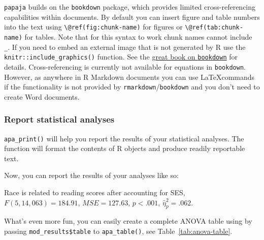 \documentclass[
  english,
  man]{apa6}
\begin{document}
\texttt{papaja} builds on the \texttt{bookdown} package, which provides limited cross-referencing capabilities within documents.
By default you can insert figure and table numbers into the text using \texttt{\textbackslash{}@ref(fig:chunk-name)} for figures or \texttt{\textbackslash{}@ref(tab:chunk-name)} for tables.
Note that for this syntax to work chunk names cannot include \texttt{\_}.
If you need to embed an external image that is not generated by R use the \texttt{knitr::include\_graphics()} function.
See the \href{https://bookdown.org/yihui/bookdown/cross-references.html}{great book on \texttt{bookdown}} for details.
Cross-referencing is currently not available for equations in \texttt{bookdown}.
However, as anywhere in R Markdown documents you can use \LaTeX commands if the functionality is not provided by \texttt{rmarkdown}/\texttt{bookdown} and you don't need to create Word documents.

\hypertarget{report-statistical-analyses}{%
\subsubsection{Report statistical analyses}\label{report-statistical-analyses}}

\texttt{apa\_print()} will help you report the results of your statistical analyses.
The function will format the contents of R objects and produce readily reportable text.

Now, you can report the results of your analyses like so:

Race is related to reading scores after accounting for SES,
\(F(5, 14,063) = 184.91\), \(\mathit{MSE} = 127.63\), \(p < .001\), \(\hat{\eta}^2_p = .062\).

What's even more fun, you can easily create a complete ANOVA table using by passing \texttt{mod\_results\$table} to \texttt{apa\_table()}, see Table~\ref{tab:anova-table}.
\end{document}
